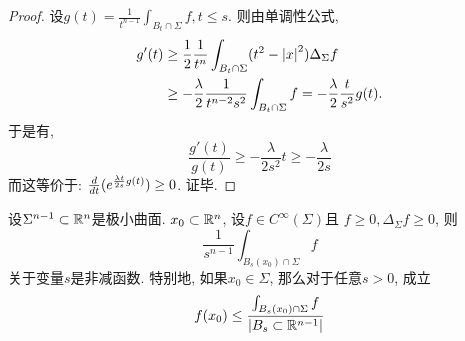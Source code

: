 \begin{proof}
    设$g(t)=\frac{1}{t^{n-1}}\int_{B_t\cap \Sigma}f, t\le s$. 则由单调性公式, 
    \begin{equation}
        \begin{split}
            g'(t) &\ge \frac{1}{2}\frac{1}{t^n}\int_{B_t\cap \Sigma}(t^2-\left | x \right |^2)\Delta_\Sigma f \\
            &\ge -\frac{\lambda}{2}\frac{1}{t^{n-2}s^2}\int_{B_t\cap \Sigma}f = -\frac{\lambda}{2}\frac{t}{s^2}g(t).
        \end{split}
    \end{equation}
    于是有,
    \begin{equation}
        \frac{g'(t)}{g(t)} \ge - \frac{\lambda}{2s^2}t\ge -\frac{\lambda}{2s}
    \end{equation}
    而这等价于: $\frac{d}{dt} (e^{\frac{\lambda t}{2s}g(t)}) \ge 0$. 证毕.
\end{proof}
\begin{corollary}
    设$\Sigma^{n-1} \subset \mathbb{R}^n$是极小曲面. $x_0 \subset \mathbb{R}^n$, 设$f \in C^\infty(\Sigma)$且 $f \ge 0, \Delta_{\Sigma}f \ge 0$, 则
    \begin{equation}
        \frac{1}{s^{n-1}} \int_{B_s(x_0)\cap \Sigma}f
    \end{equation}
    关于变量$s$是非减函数. 特别地, 如果$x_0 \in \Sigma$, 那么对于任意$s>0$, 成立
    \begin{equation}
        f(x_0) \le \frac{\int_{B_s(x_0)\cap \Sigma} f}{ \left | B_s\subset \mathbb{R}^{n-1} \right |}
    \end{equation}
\end{corollary}
